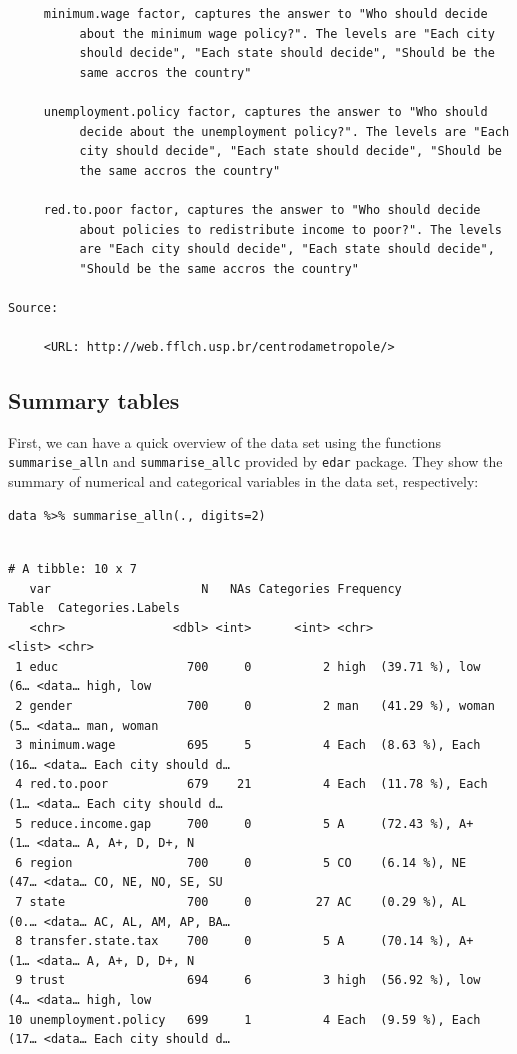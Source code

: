 \documentclass[a4paper]{article}
\begin{document}
\begin{lstlisting}
     minimum.wage factor, captures the answer to "Who should decide
          about the minimum wage policy?". The levels are "Each city
          should decide", "Each state should decide", "Should be the
          same accros the country"

     unemployment.policy factor, captures the answer to "Who should
          decide about the unemployment policy?". The levels are "Each
          city should decide", "Each state should decide", "Should be
          the same accros the country"

     red.to.poor factor, captures the answer to "Who should decide
          about policies to redistribute income to poor?". The levels
          are "Each city should decide", "Each state should decide",
          "Should be the same accros the country"

Source:

     <URL: http://web.fflch.usp.br/centrodametropole/>
\end{lstlisting}


\subsection{Summary tables}
\label{sec:org60b44fe}
First, we can have a quick overview of the data set using the functions \texttt{summarise\_alln} and \texttt{summarise\_allc} provided by \texttt{edar} package. They show the summary of numerical and categorical variables in the data set, respectively:

\lstset{numbers=left,language=r,label= ,caption= ,captionpos=b}
\begin{lstlisting}
data %>% summarise_alln(., digits=2)
    
\end{lstlisting}

\begin{verbatim}
# A tibble: 10 x 7
   var                     N   NAs Categories Frequency                  Table  Categories.Labels  
   <chr>               <dbl> <int>      <int> <chr>                      <list> <chr>              
 1 educ                  700     0          2 high  (39.71 %), low   (6… <data… high, low          
 2 gender                700     0          2 man   (41.29 %), woman (5… <data… man, woman         
 3 minimum.wage          695     5          4 Each  (8.63 %), Each  (16… <data… Each city should d…
 4 red.to.poor           679    21          4 Each  (11.78 %), Each  (1… <data… Each city should d…
 5 reduce.income.gap     700     0          5 A     (72.43 %), A+    (1… <data… A, A+, D, D+, N    
 6 region                700     0          5 CO    (6.14 %), NE    (47… <data… CO, NE, NO, SE, SU 
 7 state                 700     0         27 AC    (0.29 %), AL    (0.… <data… AC, AL, AM, AP, BA…
 8 transfer.state.tax    700     0          5 A     (70.14 %), A+    (1… <data… A, A+, D, D+, N    
 9 trust                 694     6          3 high  (56.92 %), low   (4… <data… high, low          
10 unemployment.policy   699     1          4 Each  (9.59 %), Each  (17… <data… Each city should d…
\end{verbatim}
\end{document}

